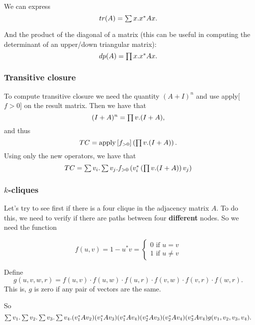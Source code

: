 We can express $$tr(A)=\textstyle\sum x. x^*Ax.$$

And the product of the diagonal of a matrix (this can be useful in computing the determinant of an upper/down triangular matrix): $$dp(A)=\textstyle\prod x. x^*Ax.$$

\subsubsection{Transitive closure}

To compute transitive closure we need the quantity $(A+I)^n$ and use apply[$f>0$] on the result matrix. Then we have that $$(I+A)^n=\textstyle\prod v. (I+A),$$ and thus $$TC = \text{apply}\left[ f_{>0}\right]\left( \textstyle\prod v. (I+A) \right).$$
Using only the new operators, we have that $$TC=\textstyle\sum v_i. \textstyle\sum v_j. f_{>0}\left(v_i^*\left(\textstyle\prod v. (I+A)\right)v_j\right)$$

\subsubsection{$k$-cliques}

Let's try to see first if there is a four clique in the adjacency matrix $A$. To do this, we need to verify if there are paths between four \textbf{different} nodes. So we need the function 

\[
  			f(u,v)=1-u^*v=\begin{cases}
               0 \text{ if } u=v \\
               1 \text{ if } u\neq v
            \end{cases}
		\]

Define $$g(u,v,w,r)=f(u,v)\cdot f(u,w)\cdot f(u,r)\cdot f(v,w)\cdot f(v,r)\cdot f(w,r).$$ This is, $g$ is zero if any pair of vectors are the same.
		
So $$\textstyle\sum v_1.\textstyle\sum v_2. \textstyle\sum v_3. \textstyle\sum v_4. (v_1^*Av_2)(v_1^*Av_3)(v_1^*Av_4)(v_2^*Av_3)(v_2^*Av_4)(v_3^*Av_4)g(v_1,v_2,v_3,v_4).$$

\label{sec:extmatlang}